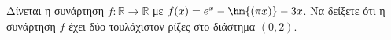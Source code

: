Δίνεται η συνάρτηση $ f:\mathbb{R}\to\mathbb{R} $ με $ f(x)=e^x-\hm{(\pi x)}-3x $. Να δείξετε ότι η συνάρτηση $ f $ έχει δύο τουλάχιστον ρίζες στο διάστημα $ (0,2) $.
